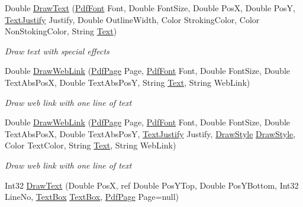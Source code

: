 \begin{DoxyCompactItemize}
Double \hyperlink{class_pdf_file_writer_1_1_pdf_contents_ae475426e1a49a9fb83fbb43bf06873a8}{Draw\+Text} (\hyperlink{class_pdf_file_writer_1_1_pdf_font}{Pdf\+Font} Font, Double Font\+Size, Double PosX, Double PosY, \hyperlink{namespace_pdf_file_writer_a3991bfacc8c7be240452dd24ec817157}{Text\+Justify} Justify, Double Outline\+Width, Color Stroking\+Color, Color Non\+Stoking\+Color, String \hyperlink{namespace_pdf_file_writer_a45e52c090a4d8e1333577773ec0bac4aa9dffbf69ffba8bc38bc4e01abf4b1675}{Text})
\begin{DoxyCompactList}\small\item\em Draw text with special effects \end{DoxyCompactList}\item 
Double \hyperlink{class_pdf_file_writer_1_1_pdf_contents_ae2aa694ed66c2c90ab82c745e70eb971}{Draw\+Web\+Link} (\hyperlink{class_pdf_file_writer_1_1_pdf_page}{Pdf\+Page} Page, \hyperlink{class_pdf_file_writer_1_1_pdf_font}{Pdf\+Font} Font, Double Font\+Size, Double Text\+Abs\+PosX, Double Text\+Abs\+PosY, String \hyperlink{namespace_pdf_file_writer_a45e52c090a4d8e1333577773ec0bac4aa9dffbf69ffba8bc38bc4e01abf4b1675}{Text}, String Web\+Link)
\begin{DoxyCompactList}\small\item\em Draw web link with one line of text \end{DoxyCompactList}\item 
Double \hyperlink{class_pdf_file_writer_1_1_pdf_contents_ae0a03bf947fad838d044a30a7bb5f4b9}{Draw\+Web\+Link} (\hyperlink{class_pdf_file_writer_1_1_pdf_page}{Pdf\+Page} Page, \hyperlink{class_pdf_file_writer_1_1_pdf_font}{Pdf\+Font} Font, Double Font\+Size, Double Text\+Abs\+PosX, Double Text\+Abs\+PosY, \hyperlink{namespace_pdf_file_writer_a3991bfacc8c7be240452dd24ec817157}{Text\+Justify} Justify, \hyperlink{namespace_pdf_file_writer_a2bcdd73c6cedab15d6f6c2a64333ef39}{Draw\+Style} \hyperlink{namespace_pdf_file_writer_a2bcdd73c6cedab15d6f6c2a64333ef39}{Draw\+Style}, Color Text\+Color, String \hyperlink{namespace_pdf_file_writer_a45e52c090a4d8e1333577773ec0bac4aa9dffbf69ffba8bc38bc4e01abf4b1675}{Text}, String Web\+Link)
\begin{DoxyCompactList}\small\item\em Draw web link with one line of text \end{DoxyCompactList}\item 
Int32 \hyperlink{class_pdf_file_writer_1_1_pdf_contents_a4653e1b631347124e479e8b6ef911b39}{Draw\+Text} (Double PosX, ref Double Pos\+Y\+Top, Double Pos\+Y\+Bottom, Int32 Line\+No, \hyperlink{class_pdf_file_writer_1_1_text_box}{Text\+Box} \hyperlink{class_pdf_file_writer_1_1_text_box}{Text\+Box}, \hyperlink{class_pdf_file_writer_1_1_pdf_page}{Pdf\+Page} Page=null)

\end{DoxyCompactItemize}
